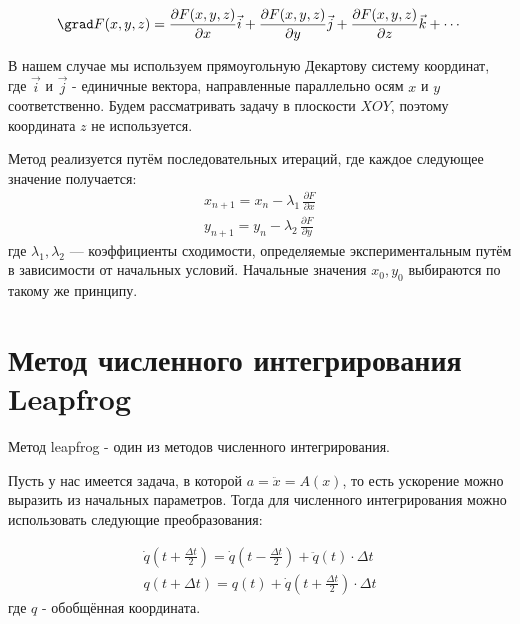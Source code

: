 \documentclass[12pt, a4paper]{article}
\begin{document}
    \begin{equation*}
        \grad F(x, y, z) = \frac{\partial F(x, y, z)}{\partial x} \vec{i} + \frac{\partial F(x, y, z)}{\partial y} \vec{j}+ \frac{\partial F(x, y, z)}{\partial z} \vec{k} + \cdots
    \end{equation*}

    В нашем случае мы используем прямоугольную Декартову систему координат, где $\vec i$ и $\vec j$ - единичные вектора, направленные параллельно осям $x$  и $y$ соответственно.
    Будем рассматривать задачу в плоскости $XOY$, поэтому координата  $z$ не используется.

    Метод реализуется путём последовательных итераций, где каждое следующее значение получается:
    \begin{gather*}
        x_{n + 1} = x_n - \lambda_1 \,\frac{\partial F}{\partial x}\\
        y_{n + 1} = y_n - \lambda_2 \,\frac{\partial F}{\partial y}
    \end{gather*}
    где $\lambda_1, \lambda_2$ --- коэффициенты сходимости, определяемые экспериментальным путём в зависимости от начальных условий.
    Начальные значения $x_0, y_0$ выбираются по такому же принципу.

    \section{Метод численного интегрирования Leapfrog}

    Метод leapfrog - один из методов численного интегрирования.

    Пусть у нас имеется задача, в которой $a =  \ddot x = A(x)$, то есть ускорение можно выразить из начальных параметров.
    Тогда для численного интегрирования можно использовать следующие преобразования:

    \begin{gather*}
        \dot q \left(t + \frac{\Delta t}{2} \right) = \dot q \left(t - \frac{\Delta t}{2} \right) + \ddot q (t) \cdot \Delta t\\
        q \left(t + \Delta t \right) = q(t) + \dot q \left(t + \frac{\Delta t}{2} \right) \cdot \Delta t
    \end{gather*}
    где $q$ - обобщённая координата.
\end{document}
